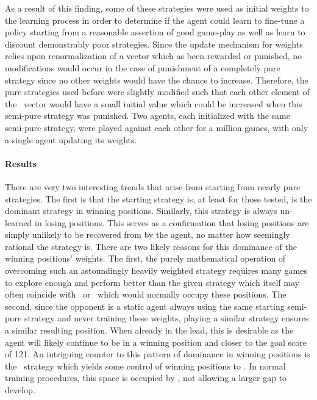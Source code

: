 As a result of this finding,
some of these strategies were used as initial weights to the learning process
in order to determine if the agent could learn to fine-tune a policy starting
from a reasonable assertion of good game-play
as well as learn to discount demonstrably poor strategies.
%
Since the update mechanism for weights relies upon renormalization of a vector
which as been rewarded or punished,
no modifications would occur in the case of punishment of a completely pure strategy
since no other weights would have the chance to increase.
%
Therefore,
the pure strategies used before were slightly modified
such that each other
element of the \wvec\ vector would have a small initial value which could be
increased when this semi-pure strategy was punished.
%
Two agents,
each initialized with the same semi-pure strategy,
were played against each other for a million games,
with only a single agent updating its weights.




\paragraph*{Results}

There are very two interesting trends that arise from starting from nearly pure
strategies.
%
The first is that the starting strategy is,
at least for those tested,
is the dominant strategy in winning positions.
%
Similarly,
this strategy is always un-learned in losing positions.
%
This serves as a confirmation that losing positions are simply unlikely to be
recovered from by the agent,
no matter how seemingly rational the strategy is.
%
There are two likely reasons for this dominance of the winning positions'
weights.
%
The first,
the purely mathematical operation of overcoming such an astoundingly heavily
weighted strategy requires many games to explore enough and perform better than
the given strategy
which itself may often coincide with \handmaxavg\ or \handmaxmin\ 
which would normally occupy these positions.
%
The second,
since the opponent is a static agent always using the same starting
semi-pure strategy and never training these weights,
playing a similar strategy ensures a similar resulting position.
%
When already in the lead,
this is desirable as the agent will likely continue to be in a winning position
and closer to the goal score of 121.
%
An intriguing counter to this pattern of dominance in winning positions
is the \handmaxavg\ strategy
which yields some control of winning positions to \handmaxmed.
%
In normal training procedures,
this space is occupied by \handmaxmin,
not allowing a larger gap to develop.

